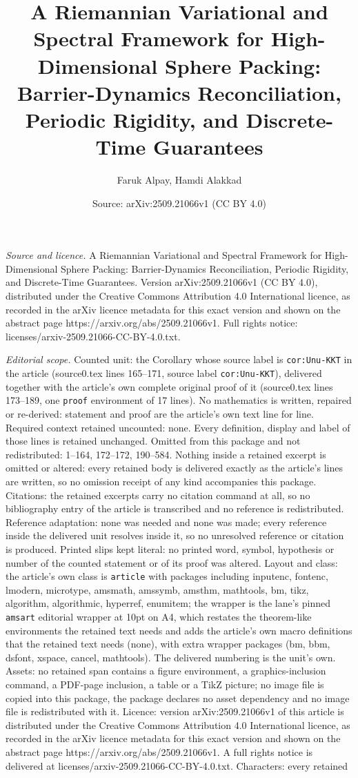 \documentclass[10pt,a4paper]{amsart}
\title[A Riemannian Variational and Spectral Framework for High-Dim]{A Riemannian Variational and Spectral Framework for High-Dimensional Sphere Packing: Barrier-Dynamics Reconciliation, Periodic Rigidity, and Discrete-Time Guarantees}
\author{Faruk Alpay, Hamdi Alakkad}
\date{Source: arXiv:2509.21066v1 (CC BY 4.0)}
\begin{document}
\maketitle

\noindent\emph{Source and licence.} A Riemannian Variational and Spectral Framework for High-Dimensional Sphere Packing: Barrier-Dynamics Reconciliation, Periodic Rigidity, and Discrete-Time Guarantees. Version arXiv:2509.21066v1 (CC BY 4.0), distributed under the Creative Commons Attribution 4.0 International licence, as recorded in the arXiv licence metadata for this exact version and shown on the abstract page https://arxiv.org/abs/2509.21066v1. Full rights notice: licenses/arxiv-2509.21066-CC-BY-4.0.txt.\par\smallskip

\noindent\textit{Editorial scope.} Counted unit: the Corollary whose source label is \texttt{cor:Unu-KKT} in the article (source0.tex lines 165--171, source label \texttt{cor:Unu-KKT}), delivered together with the article's own complete original proof of it (source0.tex lines 173--189, one \texttt{proof} environment of 17 lines). No mathematics is written, repaired or re-derived: statement and proof are the article's own text line for line. Required context retained uncounted: none. Every definition, display and label of those lines is retained unchanged. Omitted from this package and not redistributed: 1--164, 172--172, 190--584. Nothing inside a retained excerpt is omitted or altered: every retained body is delivered exactly as the article's lines are written, so no omission receipt of any kind accompanies this package. Citations: the retained excerpts carry no citation command at all, so no bibliography entry of the article is transcribed and no reference is redistributed. Reference adaptation: none was needed and none was made; every reference inside the delivered unit resolves inside it, so no unresolved reference or citation is produced. Printed slips kept literal: no printed word, symbol, hypothesis or number of the counted statement or of its proof was altered. Layout and class: the article's own class is \texttt{article} with packages including inputenc, fontenc, lmodern, microtype, amsmath, amssymb, amsthm, mathtools, bm, tikz, algorithm, algorithmic, hyperref, enumitem; the wrapper is the lane's pinned \texttt{amsart} editorial wrapper at 10pt on A4, which restates the theorem-like environments the retained text needs and adds the article's own macro definitions that the retained text needs (none), with extra wrapper packages (bm, bbm, dsfont, xspace, cancel, mathtools). The delivered numbering is the unit's own. Assets: no retained span contains a figure environment, a graphics-inclusion command, a PDF-page inclusion, a table or a TikZ picture; no image file is copied into this package, the package declares no asset dependency and no image file is redistributed with it. Licence: version arXiv:2509.21066v1 of this article is distributed under the Creative Commons Attribution 4.0 International licence, as recorded in the arXiv licence metadata for this exact version and shown on the abstract page https://arxiv.org/abs/2509.21066v1. A full rights notice is delivered at licenses/arxiv-2509.21066-CC-BY-4.0.txt. Characters: every retained 
\end{document}

